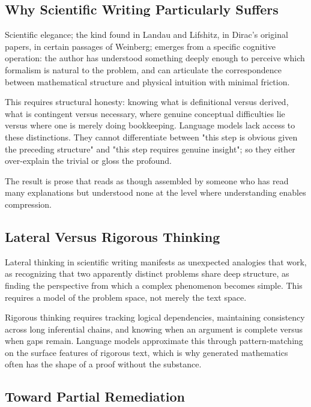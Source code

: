 \subsection*{Why Scientific Writing Particularly Suffers}

Scientific elegance; the kind found in Landau and Lifshitz, in Dirac's original papers, in certain passages of Weinberg; emerges from a specific cognitive operation: the author has understood something deeply enough to perceive which formalism is natural to the problem, and can articulate the correspondence between mathematical structure and physical intuition with minimal friction.

This requires structural honesty: knowing what is definitional versus derived, what is contingent versus necessary, where genuine conceptual difficulties lie versus where one is merely doing bookkeeping. Language models lack access to these distinctions. They cannot differentiate between "this step is obvious given the preceding structure" and "this step requires genuine insight"; so they either over-explain the trivial or gloss the profound.

The result is prose that reads as though assembled by someone who has read many explanations but understood none at the level where understanding enables compression.

\subsection*{Lateral Versus Rigorous Thinking}

Lateral thinking in scientific writing manifests as unexpected analogies that work, as recognizing that two apparently distinct problems share deep structure, as finding the perspective from which a complex phenomenon becomes simple. This requires a model of the problem space, not merely the text space.

Rigorous thinking requires tracking logical dependencies, maintaining consistency across long inferential chains, and knowing when an argument is complete versus when gaps remain. Language models approximate this through pattern-matching on the surface features of rigorous text, which is why generated mathematics often has the shape of a proof without the substance.

\subsection*{Toward Partial Remediation}

